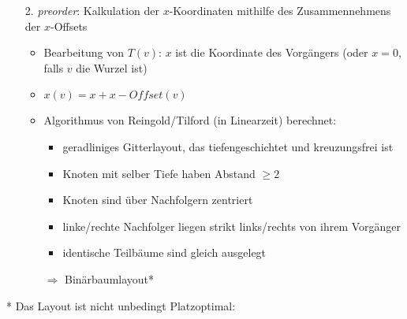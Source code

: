 \begin{itemize}[itemsep=-1pt]
\begin{enumerate}
\begin{minipage}{0.47\textwidth}
			\end{minipage}
			\item[2.] \textit{preorder}: Kalkulation der $x$-Koordinaten mithilfe des Zusammennehmens der $x$-Offsets
				\begin{itemize}
					\item Bearbeitung von $T(v)$: $x$ ist die Koordinate des Vorgängers (oder $x=0$, falls $v$ die Wurzel ist)
					\item $x(v)  = x+ x-Offset(v)$
					\item Algorithmus von Reingold/Tilford (in Linearzeit) berechnet:
						\begin{itemize}
							\item geradliniges Gitterlayout, das tiefengeschichtet und kreuzungsfrei ist
							\item Knoten mit selber Tiefe haben Abstand $\geq 2$
							\item Knoten sind über Nachfolgern zentriert
							\item linke/rechte Nachfolger liegen strikt links/rechts von ihrem Vorgänger
							\item identische Teilbäume sind gleich ausgelegt
						\end{itemize}
						$\Rightarrow$ Binärbaumlayout*
				\end{itemize}
		\end{enumerate} 
\end{itemize}

\topbreak
* Das Layout ist nicht unbedingt Platzoptimal:\\
\begin{minipage}{0.45\textwidth}
	
\end{minipage}\hfill
\begin{minipage}{0.45\textwidth}
	
\end{minipage}
